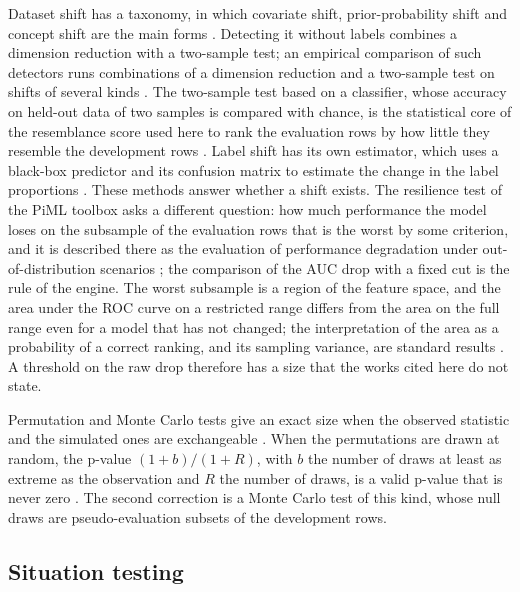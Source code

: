 Dataset shift has a taxonomy, in which covariate shift, prior-probability shift and concept shift are the main forms \citep{morenotorres2012}. Detecting it without labels combines a dimension reduction with a two-sample test; an empirical comparison of such detectors runs combinations of a dimension reduction and a two-sample test on shifts of several kinds \citep{rabanser2019}. The two-sample test based on a classifier, whose accuracy on held-out data of two samples is compared with chance, is the statistical core of the resemblance score used here to rank the evaluation rows by how little they resemble the development rows \citep{lopezpaz2017}. Label shift has its own estimator, which uses a black-box predictor and its confusion matrix to estimate the change in the label proportions \citep{lipton2018}. These methods answer whether a shift exists. The resilience test of the PiML toolbox asks a different question: how much performance the model loses on the subsample of the evaluation rows that is the worst by some criterion, and it is described there as the evaluation of performance degradation under out-of-distribution scenarios \citep{sudjianto2023}; the comparison of the AUC drop with a fixed cut is the rule of the engine. The worst subsample is a region of the feature space, and the area under the ROC curve on a restricted range differs from the area on the full range even for a model that has not changed; the interpretation of the area as a probability of a correct ranking, and its sampling variance, are standard results \citep{hanley1982,delong1988}. A threshold on the raw drop therefore has a size that the works cited here do not state.

Permutation and Monte Carlo tests give an exact size when the observed statistic and the simulated ones are exchangeable \citep{davison1997}. When the permutations are drawn at random, the p-value $(1+b)/(1+R)$, with $b$ the number of draws at least as extreme as the observation and $R$ the number of draws, is a valid p-value that is never zero \citep{phipson2010}. The second correction is a Monte Carlo test of this kind, whose null draws are pseudo-evaluation subsets of the development rows.

\subsection{Situation testing}

